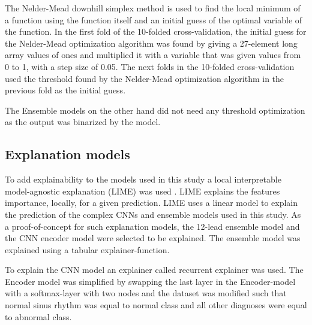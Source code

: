 The Nelder-Mead downhill simplex method is used to find the local minimum of a function using the function itself and an initial guess of the optimal variable of the function. In the first fold of the 10-folded cross-validation, the initial guess for the Nelder-Mead optimization algorithm was found by giving a 27-element long array values of ones and multiplied it with a variable that was given values from 0 to 1, with a step size of 0.05. The next folds in the 10-folded cross-validation used the threshold found by the Nelder-Mead optimization algorithm in the previous fold as the initial guess. 

The Ensemble models on the other hand did not need any threshold optimization  as the output was binarized by the model.





\subsection{Explanation models}
To add explainability to the models used in this study a local interpretable model-agnostic explanation (LIME) was used \cite{ribeiro_why_2016}. LIME explains the features importance, locally, for a given prediction. LIME uses a linear model to explain the prediction of the complex CNNs and ensemble models used in this study. As a proof-of-concept for such explanation models, the 12-lead ensemble model and the CNN encoder model were selected to be explained. The ensemble model was explained using a tabular explainer-function.

To explain the CNN model an explainer called recurrent explainer was used. The Encoder model was simplified by swapping the last layer in the Encoder-model with a softmax-layer with two nodes and the dataset was modified such that normal sinus rhythm was equal to normal class and all other diagnoses were equal to abnormal class.

\newpage
